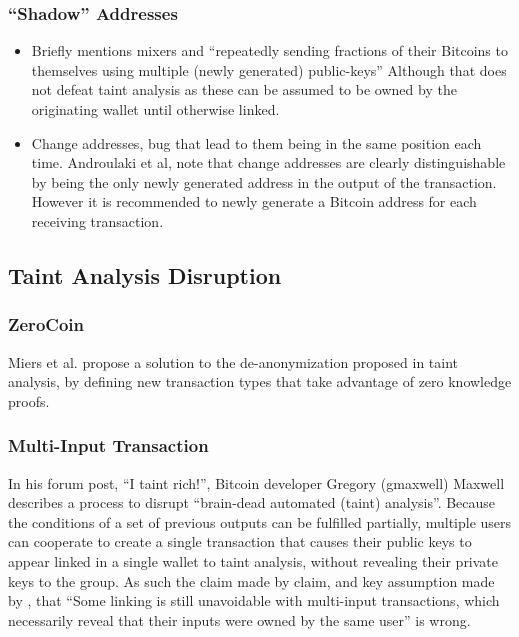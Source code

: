 \subsubsection{``Shadow'' Addresses}


\begin{itemize} \item Briefly mentions mixers and ``repeatedly sending fractions
        of their Bitcoins to themselves using multiple (newly generated)
    public-keys'' Although that does not defeat taint analysis as these can be
assumed to be owned by the originating wallet until otherwise linked.  \item
    Change addresses, bug that lead to them being in the same position each
    time.  Androulaki et al, note that change addresses are clearly
    distinguishable by being the only newly generated address in the output of
    the transaction.  However it is recommended to newly generate a Bitcoin
    address for each receiving transaction.  \end{itemize}

\subsection{Taint Analysis Disruption}

\subsubsection{ZeroCoin} Miers et al.
propose a solution to the de-anonymization proposed in taint analysis, by
defining new transaction types that take advantage of zero knowledge
proofs\cite{zerocoin}.  \subsubsection{Multi-Input Transaction}

In his forum post, ``I taint rich!'', Bitcoin developer Gregory (gmaxwell)
Maxwell describes a process to disrupt ``brain-dead automated (taint)
analysis''.  Because the conditions of a set of previous outputs can be
fulfilled partially, multiple users can cooperate to create a single transaction
that causes their public keys to appear linked in a single wallet to taint
analysis, without revealing their private keys to the group.  As such the claim made by \textcite{satoshi}
claim, and key assumption made by \textcite{reid-anon}, that ``Some linking is
still unavoidable with multi-input transactions, which necessarily reveal that
their inputs were owned by the same user'' is wrong.


